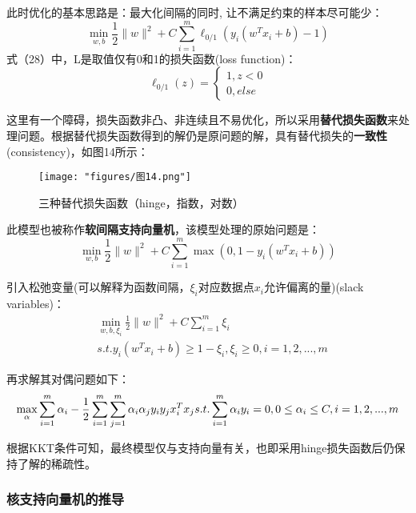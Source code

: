 此时优化的基本思路是：最大化间隔的同时, 让不满足约束的样本尽可能少：
\begin{equation}\min_{w,b}\frac12\|w\|^2+C\sum_{i=1}^m\ell_{0/1}(y_i(w^Tx_i+b)-1)\end{equation}
式（28）中，L是取值仅有0和1的损失函数(loss function)：
\begin{equation}\ell_{0/1}(z)=\begin{cases}1,z<0\\0,else\end{cases}\end{equation}

这里有一个障碍，损失函数非凸、非连续且不易优化，所以采用\textbf{替代损失函数}来处理问题。根据替代损失函数得到的解仍是原问题的解，具有替代损失的\textbf{一致性}(consistency)，如图14所示：
\begin{figure}[h] %
	\centering
	\texttt{[image: "figures/图14.png"]} %
	\caption{三种替代损失函数（hinge，指数，对数）} %
	\label{fig:example} %
\end{figure}

此模型也被称作\textbf{软间隔支持向量机}，该模型处理的原始问题是：
\begin{equation}\min_{w,b}\frac12\|w\|^2+C\sum_{i=1}^m\max(0,1-y_i(w^Tx_i+b))\end{equation}

引入松弛变量(可以解释为函数间隔，$\xi_{i}$对应数据点$x_{i}$允许偏离的量)(slack variables)：
\begin{equation}\begin{aligned}&\min_{w,b,\xi_i}\frac12\|w\|^2+C\sum_{i=1}^m\xi_i\\&s.t.y_i(w^Tx_i+b)\geq1-\xi_i,\xi_i\geq0,i=1,2,...,m\end{aligned}\end{equation}

再求解其对偶问题如下：
\begin{equation}\max_\alpha\sum_{i=1}^m\alpha_i-\frac12\sum_{i=1}^m\sum_{j=1}^m\alpha_i\alpha_jy_iy_jx_i^Tx_j\\s.t.\sum_{i=1}^m\alpha_iy_i=0,0\leq\alpha_i\leq C,i=1,2,...,m\end{equation}

根据KKT条件可知，最终模型仅与支持向量有关，也即采用hinge损失函数后仍保持了解的稀疏性。

\subsubsection{核支持向量机的推导}

